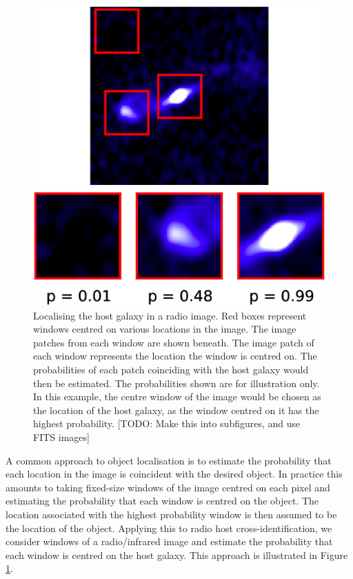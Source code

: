 \documentclass[fleqn,usenatbib,usedcolumn]{mnras}
\begin{document}
    \begin{figure}
      \centering
      \includegraphics[width=0.8\columnwidth]{images/windows.eps}
      \caption{Localising the host galaxy in a radio image. Red boxes
        represent windows centred on various locations in the image. The image
        patches from each window are shown beneath. The image patch of each
        window represents the location the window is centred on. The
        probabilities of each patch coinciding with the host galaxy would then
        be estimated. The probabilities shown are for illustration only. In
        this example, the centre window of the image would be chosen as the
        location of the host galaxy, as the window centred on it has the
        highest probability. [TODO: Make this into subfigures, and use FITS
        images]}
      \label{fig:windows}
    \end{figure}

    A common approach to object localisation is to estimate the probability
    that each location in the image is coincident with the desired object. In
    practice this amounts to taking fixed-size windows of the image centred on
    each pixel and estimating the probability that each window is centred on
    the object. The location associated with the highest probability window is
    then assumed to be the location of the object. Applying this to radio host
    cross-identification, we consider windows of a radio/infrared image and
    estimate the probability that each window is centred on the host galaxy.
    This approach is illustrated in Figure \ref{fig:windows}.
\end{document}
